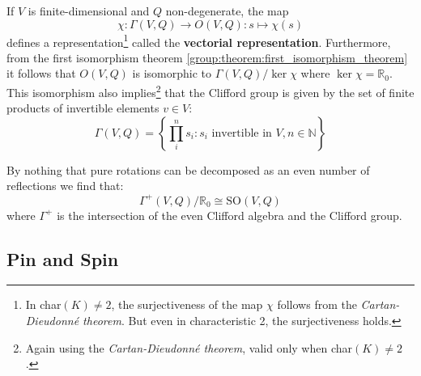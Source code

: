 	\begin{property}
		If $V$ is finite-dimensional and $Q$ non-degenerate, the map
		\begin{equation}
			\chi:\Gamma(V, Q)\rightarrow O(V, Q): s\mapsto\chi(s)
		\end{equation}
		defines a representation\footnote{In char$(K)\neq2$, the surjectiveness of the map $\chi$ follows from the \textit{Cartan-Dieudonn\'e theorem}. But even in characteristic 2, the surjectiveness holds.} called the \textbf{vectorial representation}. Furthermore, from the first isomorphism theorem \ref{group:theorem:first_isomorphism_theorem} it follows that $O(V, Q)$ is isomorphic to $\Gamma(V, Q)/\ker\chi$ where $\ker\chi = \mathbb{R}_0$. This isomorphism also implies\footnote{Again using the \textit{Cartan-Dieudonn\'e theorem}, valid only when char$(K)\neq2$.} that the Clifford group is given by the set of finite products of invertible elements $v\in V$:
		\begin{equation}
			\Gamma(V, Q) = \left\{\prod_i^n s_i : s_i\text{ invertible in }V, n\in\mathbb{N}\right\}
		\end{equation}
	\end{property}
	\begin{result}
		By nothing that pure rotations can be decomposed as an even number of reflections we find that:
		\begin{equation}
			\Gamma^+(V, Q)/\mathbb{R}_0 \cong \text{SO}(V, Q)
		\end{equation}
		where $\Gamma^+$ is the intersection of the even Clifford algebra and the Clifford group.
	\end{result}

\subsection{Pin and Spin}

